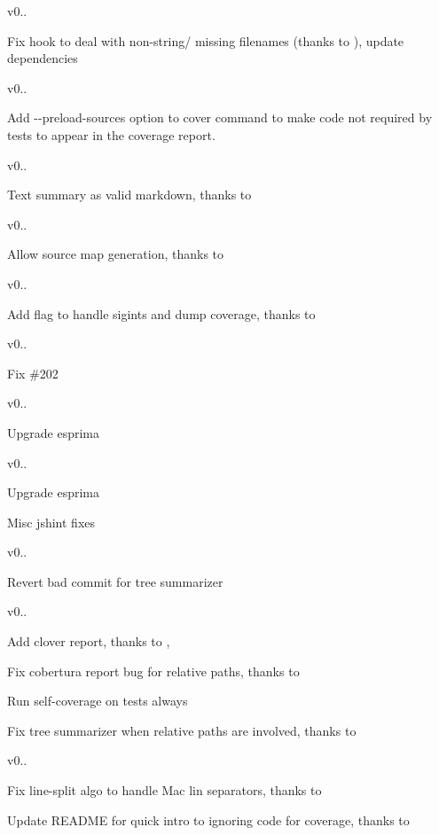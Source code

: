 v0..

Fix hook to deal with non-\/string/ missing filenames (thanks to ), update dependencies   

v0..

Add {\ttfamily -\/-\/preload-\/sources} option to {\ttfamily cover} command to make code not required by tests to appear in the coverage report.   

v0..

Text summary as valid markdown, thanks to   

v0..

Allow source map generation, thanks to   

v0..

Add flag to handle sigints and dump coverage, thanks to   

v0..

Fix \#202  

v0..

Upgrade esprima  

v0..


\begin{DoxyItemize}
\item Upgrade esprima 
\item Misc jshint fixes 
\end{DoxyItemize}

v0..


\begin{DoxyItemize}
\item Revert bad commit for tree summarizer 
\end{DoxyItemize}

v0..


\begin{DoxyItemize}
\item Add clover report, thanks to ,  
\item Fix cobertura report bug for relative paths, thanks to  
\item Run self-\/coverage on tests always 
\item Fix tree summarizer when relative paths are involved, thanks to  
\end{DoxyItemize}

v0..


\begin{DoxyItemize}
\item Fix line-\/split algo to handle Mac lin separators, thanks to  
\item Update R\+E\+A\+D\+M\+E for quick intro to ignoring code for coverage, thanks to  
\end{DoxyItemize}

